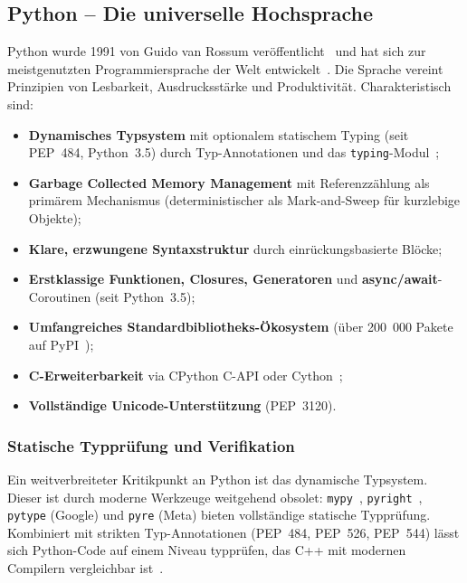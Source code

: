 ﻿\documentclass[12pt,a4paper,twoside]{article}
\begin{document}
\subsection{Python -- Die universelle Hochsprache}
\label{subsec:python}

Python wurde 1991 von Guido van Rossum veröffentlicht~\cite{vanrossum1995python}
und hat sich zur meistgenutzten Programmiersprache der Welt entwickelt~\cite{tiobe2025}.
Die Sprache vereint Prinzipien von Lesbarkeit, Ausdrucksstärke und
Produktivität. Charakteristisch sind:

\begin{itemize}
  \item \textbf{Dynamisches Typsystem} mit optionalem statischem Typing (seit PEP~484,
        Python~3.5) durch Typ-Annotationen und das \texttt{typing}-Modul~\cite{pep484};
  \item \textbf{Garbage Collected Memory Management} mit Referenzzählung als primärem
        Mechanismus (deterministischer als Mark-and-Sweep für kurzlebige Objekte);
  \item \textbf{Klare, erzwungene Syntaxstruktur} durch einrückungsbasierte Blöcke;
  \item \textbf{Erstklassige Funktionen, Closures, Generatoren} und
        \textbf{async/await}-Coroutinen (seit Python~3.5);
  \item \textbf{Umfangreiches Standardbibliotheks-Ökosystem} (über 200~000 Pakete
        auf PyPI~\cite{pypi_stats2024});
  \item \textbf{C-Erweiterbarkeit} via CPython C-API oder Cython~\cite{cython_book};
  \item \textbf{Vollständige Unicode-Unterstützung} (PEP~3120).
\end{itemize}

\subsubsection{Statische Typprüfung und Verifikation}
Ein weitverbreiteter Kritikpunkt an Python ist das dynamische Typsystem.
Dieser ist durch moderne Werkzeuge weitgehend obsolet: \texttt{mypy}~\cite{mypy_lehtosalo2016},
\texttt{pyright}~\cite{pyright_microsoft}, \texttt{pytype} (Google)
und \texttt{pyre} (Meta) bieten vollständige statische Typprüfung.
Kombiniert mit strikten Typ-Annotationen (PEP~484, PEP~526, PEP~544)
lässt sich Python-Code auf einem Niveau typprüfen, das C++
mit modernen Compilern vergleichbar ist~\cite{gros2021python_types}.
\end{document}
